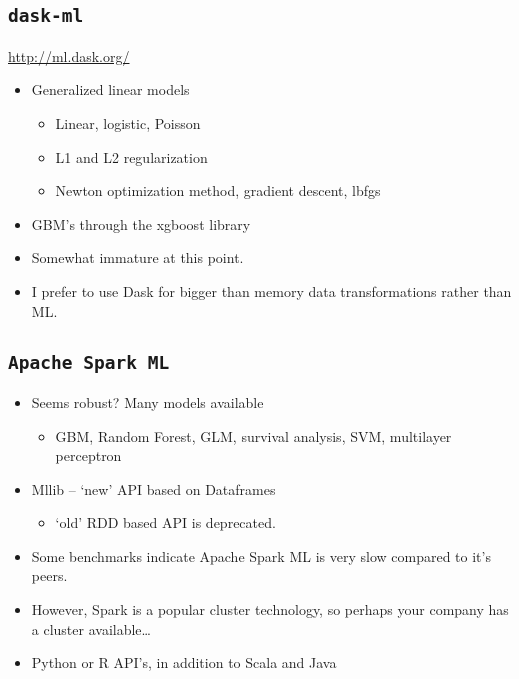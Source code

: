 \documentclass[fontset=fandol,zihao=false,scheme=chinese,heading=true,UTF8]{ctexbook}
\providecommand{\tightlist}{%
  \setlength{\itemsep}{0pt}\setlength{\parskip}{0pt}}
\begin{document}
\hypertarget{dask-ml}{%
\subsection{\texorpdfstring{\texttt{dask-ml}}{dask-ml}}\label{dask-ml}}

\url{http://ml.dask.org/}

\begin{itemize}
\tightlist
\item
  Generalized linear models

  \begin{itemize}
  \tightlist
  \item
    Linear, logistic, Poisson
  \item
    L1 and L2 regularization
  \item
    Newton optimization method, gradient descent, lbfgs
  \end{itemize}
\item
  GBM's through the xgboost library
\item
  Somewhat immature at this point.
\item
  I prefer to use Dask for bigger than memory data transformations rather than ML.
\end{itemize}

\hypertarget{apache-spark-ml}{%
\subsection{\texorpdfstring{\texttt{Apache\ Spark\ ML}}{Apache Spark ML}}\label{apache-spark-ml}}

\begin{itemize}
\tightlist
\item
  Seems robust? Many models available

  \begin{itemize}
  \tightlist
  \item
    GBM, Random Forest, GLM, survival analysis, SVM, multilayer perceptron
  \end{itemize}
\item
  Mllib -- `new' API based on Dataframes

  \begin{itemize}
  \tightlist
  \item
    `old' RDD based API is deprecated.
  \end{itemize}
\item
  Some benchmarks indicate Apache Spark ML is very slow compared to it's peers.
\item
  However, Spark is a popular cluster technology, so perhaps your company has a cluster available\ldots{}
\item
  Python or R API's, in addition to Scala and Java
\end{itemize}
\end{document}
